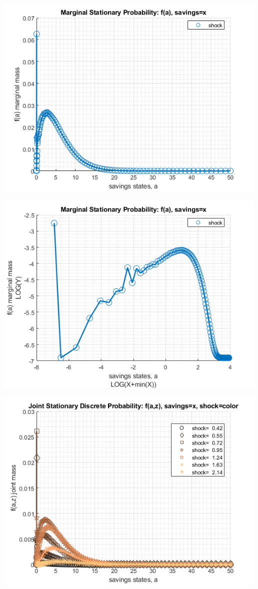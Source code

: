 \documentclass[
]{book}
\begin{document}
\includegraphics[width=5.20833in,height=\textheight]{img/fx_ds_az_cts_loop_images/figure_2.png}

\includegraphics[width=5.20833in,height=\textheight]{img/fx_ds_az_cts_loop_images/figure_3.png}

\includegraphics[width=5.20833in,height=\textheight]{img/fx_ds_az_cts_loop_images/figure_4.png}
\end{document}
